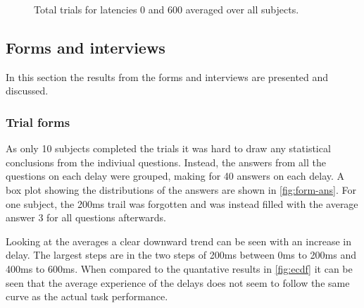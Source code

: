 \documentclass[nofilelist]{cslthse-msc}
\begin{document}
\begin{figure}[!hbt]
   \centering
   \caption{Total trials for latencies 0 and 600 averaged over all subjects.}
   \label{fig:0vs600}
\end{figure}


\subsection{Forms and interviews}
In this section the results from the forms and interviews are presented and discussed.

\subsubsection{Trial forms}
As only 10 subjects completed the trials it was hard to draw any statistical conclusions from the indiviual questions. Instead, the answers from all the questions on each delay were grouped, making for 40 answers on each delay. A box plot showing the distributions of the answers are shown in \ref{fig:form-ans}. For one subject, the 200ms trail was forgotten and was instead filled with the average answer 3 for all questions afterwards.

Looking at the averages a clear downward trend can be seen with an increase in delay. The largest steps are in the two steps of 200ms between 0ms to 200ms and 400ms to 600ms. When compared to the quantative results in \ref{fig:ecdf} it can be seen that the average experience of the delays does not seem to follow the same curve as the actual task performance.  
\end{document}
